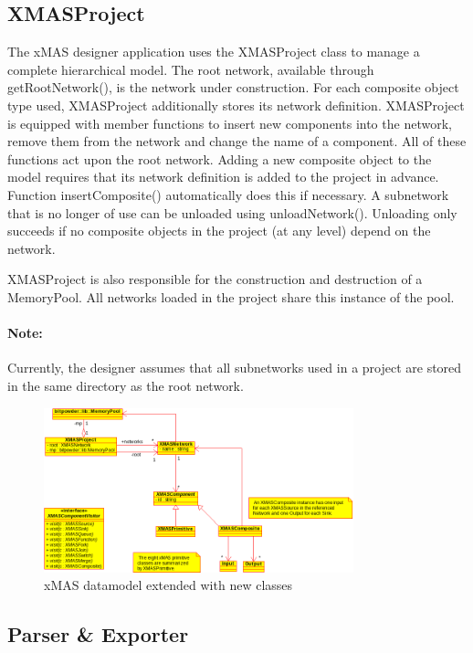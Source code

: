\subsection{XMASProject}

The xMAS designer application uses the XMASProject class to manage a complete
hierarchical model. The root network, available through getRootNetwork(), is
the network under construction. For each composite object type used, XMASProject
additionally stores its network definition. XMASProject is equipped with member
functions to insert new components into the network, remove them from the network
and change the name of a component. All of these functions act upon the root network.
Adding a new composite object to the model requires that its network definition
is added to the project in advance. Function insertComposite() automatically does
this if necessary. A subnetwork that is no longer of use can be unloaded using
unloadNetwork(). Unloading only succeeds if no composite objects in the project
(at any level) depend on the network.

XMASProject is also responsible for the construction and destruction of a MemoryPool.
All networks loaded in the project share this instance of the pool.

\paragraph{Note:}
Currently, the designer assumes that all subnetworks used in a project are
stored in the same directory as the root network.

\begin{figure}
    \centering
    \includegraphics[width=0.8\textwidth]{new-xmas-datamodel}
    \caption{xMAS datamodel extended with new classes}
\end{figure}


\subsection{Parser \& Exporter}

